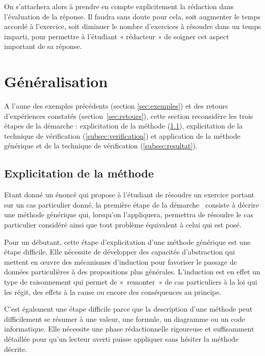 \documentclass[11pt,a4paper,colorlinks,breaklinks]{article}
\begin{document}
On s'attachera alors à prendre en compte explicitement la rédaction dans l'évaluation de la réponse. Il faudra sans doute pour cela, soit augmenter le temps accordé à l'exercice, soit diminuer le nombre d'exercices à résoudre dans un temps imparti, pour permettre à l'étudiant « rédacteur » de soigner cet aspect important de sa réponse.

\section{Généralisation}\label{sec:generalisation}

A l'aune des exemples précédents (section \ref{sec:exemples}) 
et des retours d'expériences constatés (section~\ref{sec:retours}), 
cette section reconsidère les trois étapes de la démarche \mvr : 
explicitation de la méthode (\ref{subsec:methode}), 
explicitation de la technique de vérification (\ref{subsec:verification})
et application de la méthode générique et de la technique de vérification (\ref{subsec:resultat}).

\subsection{Explicitation de la méthode}\label{subsec:methode}
Etant donné un énoncé qui propose à l'étudiant de résoudre un exercice
portant sur un cas particulier donné, la première étape de la démarche \mvr\ consiste à
décrire une méthode générique qui, lorsqu'on l'appliquera, permettra de résoudre 
le cas particulier considéré ainsi que tout problème équivalent à celui 
qui est posé.

Pour un débutant, cette étape d'explicitation d'une méthode générique est une étape  
difficile. Elle nécessite de développer des capacités 
d'abstraction qui mettent en \oe uvre des mécanismes d'induction 
pour favoriser le passage de données particulières à des propositions plus générales.
L'induction est en effet un type de raisonnement qui permet de «~remonter~»
de cas particuliers à la loi qui les régit, des effets à la cause ou encore des conséquences au principe.

C'est également une étape difficile parce que la description d'une méthode peut difficilement se résumer à une valeur, une formule, un diagramme ou un code informatique. Elle nécessite une phase rédactionnelle rigoureuse et suffisamment détaillée pour qu'un lecteur averti puisse appliquer sans hésiter la méthode décrite.
\end{document}
